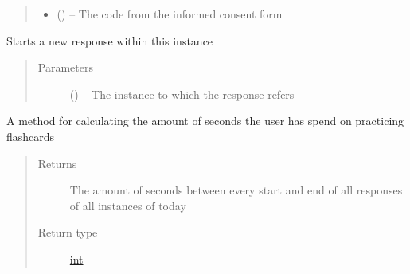 \documentclass[letterpaper,10pt,english]{sphinxmanual}
\begin{document}
\begin{fulllineitems}
\begin{fulllineitems}
\begin{quote}
\begin{description}
\begin{itemize}
\item {} 
 (\href{https://docs.python.org/2/library/string.html\#module-string}{}) -- The code from the informed consent form

\end{itemize}

\end{description}\end{quote}

\end{fulllineitems}


\begin{fulllineitems}
\label{\detokenize{user:user.User.start_response}}
Starts a new response within this instance
\begin{quote}\begin{description}
\item[{Parameters}] \leavevmode
{} ({\hyperref[\detokenize{instance:instance.Instance}]{}}) -- The instance to which the response refers

\end{description}\end{quote}

\end{fulllineitems}


\begin{fulllineitems}
\label{\detokenize{user:user.User.time_spend_today}}
A method for calculating the amount of seconds the user has spend on practicing flashcards
\begin{quote}\begin{description}
\item[{Returns}] \leavevmode
The amount of seconds between every start and end of all responses of all instances of today

\item[{Return type}] \leavevmode
\href{https://docs.python.org/2/library/functions.html\#int}{int}

\end{description}\end{quote}


\end{fulllineitems}
\end{fulllineitems}
\end{document}
